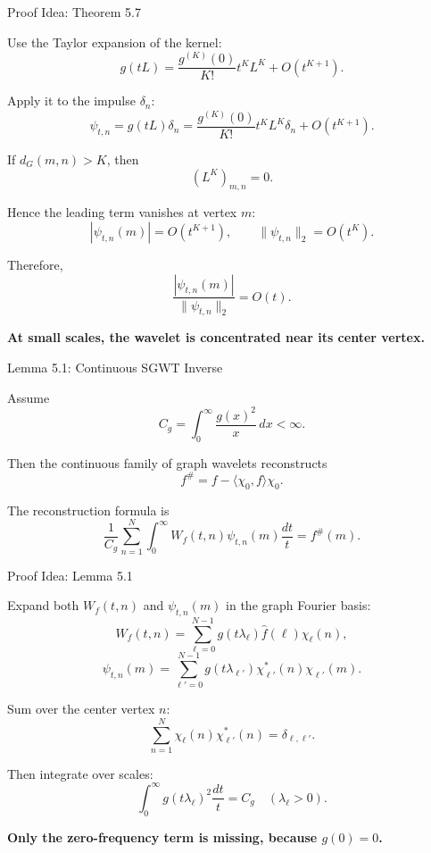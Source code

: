 \documentclass[aspectratio=1610,xcolor=dvipsnames,t]{beamer}
\newcommand{\keyterm}[1]{\textcolor{unirot}{\textbf{#1}}}
\newcommand{\inner}[2]{\langle #1,#2\rangle}
\begin{document}
\begin{frame}{Proof Idea: Theorem 5.7}

Use the Taylor expansion of the kernel:
\[
g(tL)
=
\frac{g^{(K)}(0)}{K!}t^K L^K
+
O(t^{K+1}).
\]

Apply it to the impulse $\delta_n$:
\[
\psi_{t,n}
=
g(tL)\delta_n
=
\frac{g^{(K)}(0)}{K!}t^K L^K\delta_n
+
O(t^{K+1}).
\]

If $d_G(m,n)>K$, then
\[
(L^K)_{m,n}=0.
\]

Hence the leading term vanishes at vertex $m$:
\[
|\psi_{t,n}(m)|=O(t^{K+1}),
\qquad
\|\psi_{t,n}\|_2=O(t^K).
\]

Therefore,
\[
\frac{|\psi_{t,n}(m)|}{\|\psi_{t,n}\|_2}
=
O(t).
\]

\begin{center}
\keyterm{At small scales, the wavelet is concentrated near its center vertex.}
\end{center}

\end{frame}

\begin{frame}{Lemma 5.1: Continuous SGWT Inverse}

Assume
\[
C_g=\int_0^\infty \frac{g(x)^2}{x}\,dx<\infty.
\tag{SGWT Eq.~27}
\]

Then the continuous family of graph wavelets reconstructs
\[
f^\#=f-\inner{\chi_0}{f}\chi_0.
\]

The reconstruction formula is
\[
\frac{1}{C_g}\sum_{n=1}^{N}\int_0^\infty
W_f(t,n)\psi_{t,n}(m)\frac{dt}{t}
=f^\#(m).
\tag{SGWT Eq.~28}
\]

\end{frame}

\begin{frame}{Proof Idea: Lemma 5.1}

Expand both $W_f(t,n)$ and $\psi_{t,n}(m)$ in the graph Fourier basis:
\[
W_f(t,n)
=
\sum_{\ell=0}^{N-1}
g(t\lambda_\ell)\widehat f(\ell)\chi_\ell(n),
\]
\[
\psi_{t,n}(m)
=
\sum_{\ell'=0}^{N-1}
g(t\lambda_{\ell'})\chi_{\ell'}^*(n)\chi_{\ell'}(m).
\]

Sum over the center vertex $n$:
\[
\sum_{n=1}^{N}\chi_\ell(n)\chi_{\ell'}^*(n)=\delta_{\ell,\ell'}.
\]

Then integrate over scales:
\[
\int_0^\infty g(t\lambda_\ell)^2\frac{dt}{t}=C_g
\quad(\lambda_\ell>0).
\]

\begin{center}
\keyterm{Only the zero-frequency term is missing, because $g(0)=0$.}
\end{center}

\end{frame}
\end{document}
